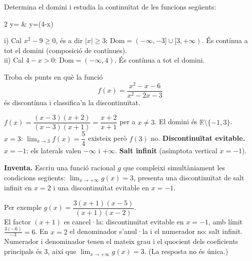 \begin{apartats}

Determina el domini i estudia la continuïtat de les funcions següents:
\begin{graella}{2}
  \sa y= & \sa y=\ln(4-x)
\end{graella}

\begin{solucio}
i) Cal $x^2-9\ge0$, és a dir $|x|\ge3$: $\mathrm{Dom}=(-\infty,-3]\cup[3,+\infty)$.
És contínua a tot el domini (composició de contínues).\\
ii) Cal $4-x>0$: $\mathrm{Dom}=(-\infty,4)$. És contínua a tot el domini.
\end{solucio}

Troba els punts en què la funció
\[
f(x)=\frac{x^2-x-6}{x^2-2x-3}
\]
és discontínua i classifica'n la discontinuïtat.

\begin{solucio}
$f(x)=\dfrac{(x-3)(x+2)}{(x-3)(x+1)}=\dfrac{x+2}{x+1}$ per a $x\ne3$.
El domini és $\mathbb{R}\setminus\{-1,3\}$.\\
$x=3$: $\lim_{x\to3}f(x)=\dfrac54$ existeix però $f(3)$ no. \textbf{Discontinuïtat evitable.}\\
$x=-1$: els laterals valen $-\infty$ i $+\infty$. \textbf{Salt infinit} (asímptota vertical $x=-1$).
\end{solucio}

\textbf{Inventa.} Escriu una funció racional $g$ que compleixi simultàniament les
condicions següents: $\lim_{x\to+\infty}g(x)=3$, presenta una discontinuïtat de salt
infinit en $x=2$ i una discontinuïtat evitable en $x=-1$.

\begin{solucio}
Per exemple $g(x)=\dfrac{3(x+1)(x-5)}{(x+1)(x-2)}$.\\
El factor $(x+1)$ es cancel·la: discontinuïtat evitable en $x=-1$, amb límit
$\frac{3(-6)}{-3}=6$. En $x=2$ el denominador s'anul·la i el numerador no: salt infinit.
Numerador i denominador tenen el mateix grau i el quocient dels coeficients principals
és $3$, així que $\lim_{x\to+\infty}g(x)=3$. (La resposta no és única.)
\end{solucio}

\end{apartats}
